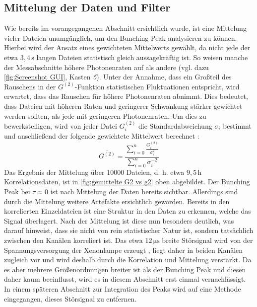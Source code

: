 \subsection{Mittelung der Daten und Filter}
\label{ssec:mittelung und filter}
Wie bereits im vorangegangenen Abschnitt ersichtlich wurde, ist eine Mittelung vieler Dateien unumgänglich, um den Bunching Peak analysieren zu können. 
Hierbei wird der Ansatz eines gewichteten Mittelwerts gewählt, da nicht jede der etwa $3{,}4\,\mathrm{s}$ langen Dateien statistisch gleich aussagekräftig ist. 
So weisen manche der Messabschnitte höhere Photonenraten auf als andere (vgl. dazu \autoref{fig:Screenshot GUI}, Kasten \emph{5}). 
Unter der Annahme, dass ein Großteil des Rauschens in der $G^{(2)}$-Funktion statistischen Fluktuationen entspricht, wird erwartet, dass das Rauschen für höhere Photonenraten abnimmt. 
Dies bedeutet, dass Dateien mit höheren Raten und geringerer Schwankung stärker gewichtet werden sollten, als jede mit geringeren Photonenraten. 
Um dies zu bewerkstelligen, wird von jeder Datei $G^{(2)}_i$ die Standardabweichung $\sigma_i$ bestimmt und anschließend der folgende gewichtete Mittelwert berechnet \cite{cochranProblemsArisingAnalysis1937}:
\begin{equation}
    \overline{G^{(2)}} = \frac{\sum_{i=0}^{n}\frac{G^{(2)}_i}{\sigma_i^2}}{\sum_{i=0}^{n} \sigma_i^{-2}}
\end{equation}
Das Ergebnis der Mittelung über 10000 Dateien, d. h. etwa $9{,}5$\,h Korrelationsdaten, ist in \autoref{fig:gemittelte G2 vs g2} oben abgebildet. 
Der Bunching Peak bei $\tau\approx 0$ ist nach Mittelung der Daten bereits sichtbar. 
Allerdings sind durch die Mittelung weitere Artefakte ersichtlich geworden. 
Bereits in den korrelierten Einzeldateien ist eine Struktur in den Daten zu erkennen, welche das Signal überlagert. 
Nach der Mittelung ist diese nun besonders deutlich, was darauf hinweist, dass sie nicht von rein statistischer Natur ist, sondern tatsächlich zwischen den Kanälen korreliert ist. 
Das etwa $12\,\mathrm{\mu s}$ breite Störsignal wird von der Spannungsversorgung der Xenonlampe erzeugt \cite{zmijaOpticalIntensityInterferometry2021}, liegt daher in beiden Kanälen zugleich vor und wird deshalb durch die Korrelation und Mittelung verstärkt. 
Da es aber mehrere Größenordnungen breiter ist als der Bunching Peak und diesen daher kaum beeinflusst, wird es in diesem Abschnitt erst einmal vernachlässigt. 
In einem späteren Abschnitt zur Integration des Peaks wird auf eine Methode eingegangen, dieses Störsignal zu entfernen. \\
